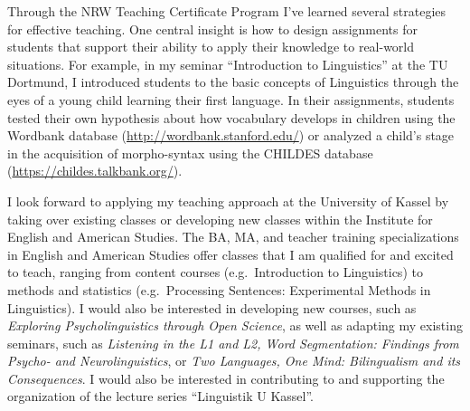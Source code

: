 \documentclass[10pt,a4paper,]{article}
\begin{document}
Through the NRW Teaching Certificate Program I've learned several
strategies for effective teaching. One central insight is how to design
assignments for students that support their ability to apply their
knowledge to real-world situations. For example, in my seminar
``Introduction to Linguistics'' at the TU Dortmund, I introduced
students to the basic concepts of Linguistics through the eyes of a
young child learning their first language. In their assignments,
students tested their own hypothesis about how vocabulary develops in
children using the Wordbank database
(\url{http://wordbank.stanford.edu/}) or analyzed a child's stage in the
acquisition of morpho-syntax using the CHILDES database
(\url{https://childes.talkbank.org/}). \linebreak

I look forward to applying my teaching approach at the University of
Kassel by taking over existing classes or developing new classes within
the Institute for English and American Studies. The BA, MA, and teacher
training specializations in English and American Studies offer classes
that I am qualified for and excited to teach, ranging from content
courses (e.g.~Introduction to Linguistics) to methods and statistics
(e.g.~Processing Sentences: Experimental Methods in Linguistics). I
would also be interested in developing new courses, such as
\emph{Exploring Psycholinguistics through Open Science}, as well as
adapting my existing seminars, such as \emph{Listening in the L1 and L2,
Word Segmentation: Findings from Psycho- and Neurolinguistics}, or
\emph{Two Languages, One Mind: Bilingualism and its Consequences}. I
would also be interested in contributing to and supporting the
organization of the lecture series ``Linguistik U Kassel''.
\end{document}
